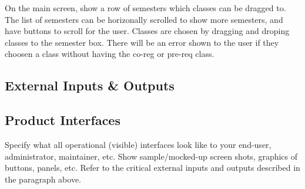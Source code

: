 On the main screen, show a row of semesters which classes can be dragged to.
The list of semesters can be horizonally scrolled to show more semesters, and
have buttons to scroll for the user.
Classes are chosen by dragging and droping classes to the semester box.
There will be an error shown to the user if they choosen a class
without having the co-reg or pre-req class.

\subsection{External Inputs \& Outputs}

\begin{table}[h]
    \caption{Overview of external inputs and outputs}
\end{table}

\subsection{Product Interfaces}
Specify what all operational (visible) interfaces look like to your
end-user, administrator, maintainer, etc. Show sample/mocked-up screen shots,
graphics of buttons, panels, etc. Refer to the critical external inputs
and outputs described in the paragraph above.

